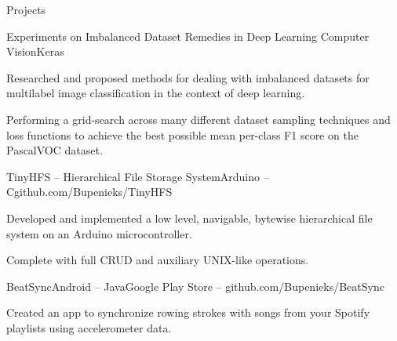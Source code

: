 \documentclass{resume} %
\begin{document}
\begin{rSection}{Projects}



\begin{rSubsection}{Experiments on Imbalanced Dataset Remedies in Deep Learning Computer Vision}{}{Keras}{}
	\item Researched and proposed methods for dealing with imbalanced datasets for multilabel image classification in the context of deep learning.
	
	\item Performing a grid-search across many different dataset sampling techniques and loss functions to achieve the best possible mean per-class F1 score on the PascalVOC dataset.
\end{rSubsection}

\begin{rSubsection}{TinyHFS -- Hierarchical File Storage System}{}{Arduino -- C}{github.com/Bupenieks/TinyHFS}

\item Developed and implemented a low level, navigable, bytewise hierarchical file system on an Arduino microcontroller.%
\item Complete with full CRUD and auxiliary UNIX-like operations.
\end{rSubsection}


\begin{rSubsection}{BeatSync}{}{Android -- Java}{Google Play Store -- github.com/Bupenieks/BeatSync}
\item Created an app to synchronize rowing strokes with songs from your Spotify playlists using accelerometer data.
\end{rSubsection}





\end{rSection}
\end{document}
